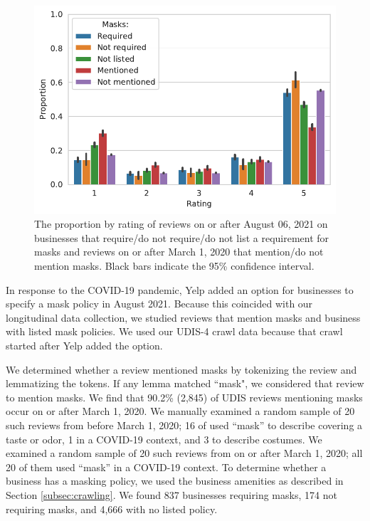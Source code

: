 \begin{figure}[t]
    \centering
    \includegraphics[width=0.9\columnwidth]{chapters/reviews/figures/proprotion_Masks_by_Rating_usa.pdf}
    \caption{The proportion by rating of reviews on or after August 06, 2021 on businesses that require/do not require/do not list a requirement for masks and reviews on or after March 1, 2020 that mention/do not mention masks. Black bars indicate the 95\% confidence interval.
    }
    \label{fig:proprotion_Masks mentions_masks required_by_rating_usa}
\end{figure}

In response to the COVID-19 pandemic, Yelp added an option for businesses to specify a mask policy in August 2021. Because this coincided with our longitudinal data collection, we studied reviews that mention masks and business with listed mask policies. We used our UDIS-4 crawl data because that crawl started after Yelp added the option. 

We determined whether a review mentioned masks by tokenizing the review and lemmatizing the tokens. If any lemma matched ``mask", we considered that review to mention masks. We find that 90.2\% (2,845) of UDIS reviews mentioning masks occur on or after March 1, 2020. We manually examined a random sample of 20 such reviews from before March 1, 2020; 16 of used ``mask'' to describe covering a taste or odor, 1 in a COVID-19 context, and 3 to describe costumes. We examined a random sample of 20 such reviews from on or after March 1, 2020; all 20 of them used ``mask'' in a COVID-19 context. To determine whether a business has a masking policy, we used the business amenities as described in Section \ref{subsec:crawling}. We found 837 businesses requiring masks, 174 not requiring masks, and 4,666 with no listed policy.

